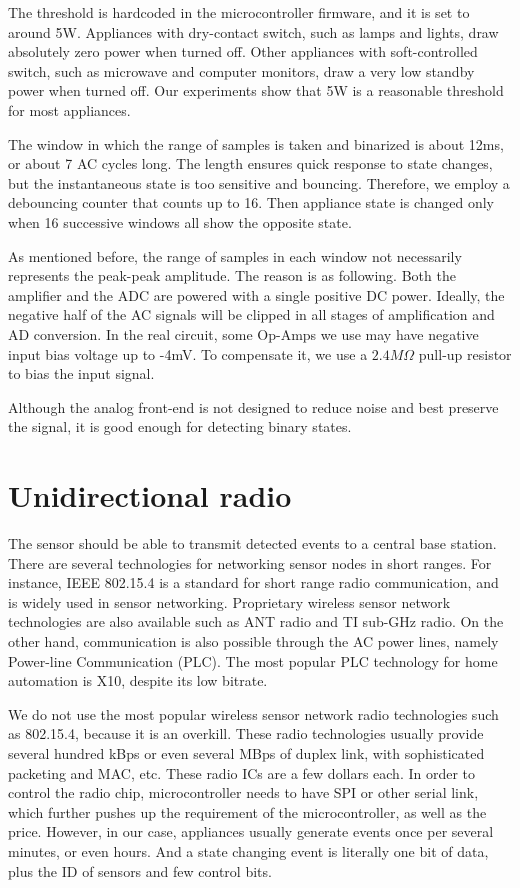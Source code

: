 The threshold is hardcoded in the microcontroller firmware, and it is set to around 5W. Appliances with dry-contact switch, such as lamps and lights, draw absolutely zero power when turned off. Other appliances with soft-controlled switch, such as microwave and computer monitors, draw a very low standby power when turned off. Our experiments show that 5W is a reasonable threshold for most appliances. 

The window in which the range of samples is taken and binarized is about 12ms, or about 7 AC cycles long. The length ensures quick response to state changes, but the instantaneous state is too sensitive and bouncing. Therefore, we employ a debouncing counter that counts up to 16. Then appliance state is changed only when 16 successive windows all show the opposite state. 

As mentioned before, the range of samples in each window not necessarily represents the peak-peak amplitude. The reason is as following. Both the amplifier and the ADC are powered with a single positive DC power. Ideally, the negative half of the AC signals will be clipped in all stages of amplification and AD conversion. In the real circuit, some Op-Amps we use may have negative input bias voltage up to -4mV. To compensate it, we use a $2.4M\Omega$ pull-up resistor to bias the input signal. 

Although the analog front-end is not designed to reduce noise and best preserve the signal, it is good enough for detecting binary states. 

\section{Unidirectional radio}

The sensor should be able to transmit detected events to a central base station. There are several technologies for networking sensor nodes in short ranges. For instance, IEEE 802.15.4 is a standard for short range radio communication, and is widely used in sensor networking. Proprietary wireless sensor network technologies are also available such as ANT radio and TI sub-GHz radio. On the other hand, communication is also possible through the AC power lines, namely Power-line Communication (PLC). The most popular PLC technology for home automation is X10, despite its low bitrate. 

We do not use the most popular wireless sensor network radio technologies such as 802.15.4, because it is an overkill. These radio technologies usually provide several hundred kBps or even several MBps of duplex link, with sophisticated packeting and MAC, etc. These radio ICs are a few dollars each. In order to control the radio chip, microcontroller needs to have SPI or other serial link, which further pushes up the requirement of the microcontroller, as well as the price. However, in our case, appliances usually generate events once per several minutes, or even hours. And a state changing event is literally one bit of data, plus the ID of sensors and few control bits. 

